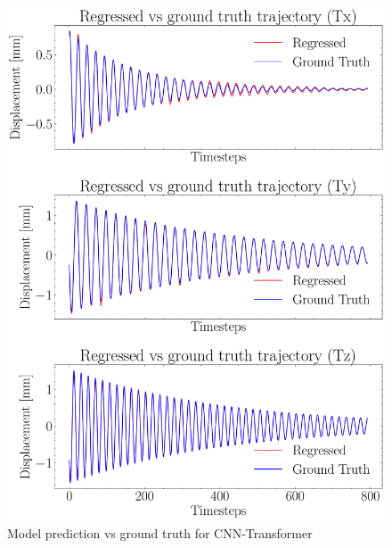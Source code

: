 \begin{figure}[H]
    \centering
    \includegraphics[scale=0.55]{images/fig_chapter4/nn_related/predicted_vs_ground_truth_transformer.pdf}
    \caption{Model prediction vs ground truth for CNN-Transformer}
    \label{fig:cnn_trans_op_vs_gt}
\end{figure}

